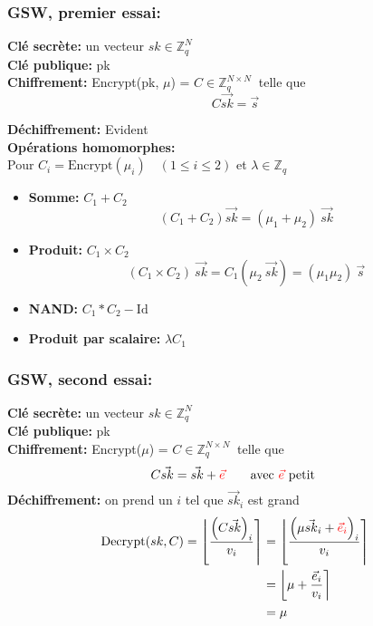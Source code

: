 \documentclass[10pt,xcolor={usenames,dvipsnames}]{beamer}
\newcommand{\ZZq}{\mathbb{Z}_q}
\begin{document}
\begin{frame} 
\frametitle{GSW, premier essai:}
\textbf{Clé secrète:} un vecteur $sk \in \ZZq^{N}$ \\
\textbf{Clé publique:} pk\\
\textbf{Chiffrement:} Encrypt(pk, $\mu$) = $C\in \ZZq^{N \times N}\:$ telle que  
\[C \vec{sk} = \vec{s}\]
\vspace{-1cm}

\textbf{Déchiffrement:} Evident \\
\textbf{Opérations homomorphes:}\\
Pour {\small$C_i = \text{Encrypt}(\mu_i) \quad(1 \leqslant i \leqslant 2)$}
et $\lambda \in \ZZq$
\begin{itemize}
\item \textbf{Somme:} $C_1 + C_2\quad$
\[\left(C_1 + C_2\right) \vec{sk} = (\mu_1 + \mu_2)\: \vec{sk}\]
\item \textbf{Produit:} $C_1 \times C_2\quad$
\[\left(C_1 \times C_2\right)\: \vec{sk} = C_1\left(\mu_2\:\vec{sk}\right) = (\mu_1 \mu_2)\:\vec{s}\]
\item \textbf{NAND:} $C_1 * C_2 - \text{Id}$
\item \textbf{Produit par scalaire:} $\lambda C_1\quad$
\end{itemize}
\end{frame} 


\begin{frame} 
\frametitle{GSW, second essai:}
\textbf{Clé secrète:} un vecteur $sk \in \ZZq^{N}$ \\
\textbf{Clé publique:} pk\\
\textbf{Chiffrement:} Encrypt($\mu$) = $C\in \ZZq^{N \times N}\:$ telle que  
\[C \vec{sk} = \vec{sk} + {\color{red}\vec{e}}\qquad \text{avec }  {\color{red}\vec{e}} \text{ petit} \]
\textbf{Déchiffrement:} on prend un $i$ tel que $\vec{sk}_i$ est grand
\begin{align*}
\text{Decrypt}(sk, C) = \left\lfloor \frac{{\left(C\vec{sk}\right)}_i}{v_i} \right\rceil &= 
\left\lfloor \frac{{\left(\mu\vec{sk}_i + {\color{red}\vec{e}_i}\right)}_i}{v_i} \right\rceil \\
&= \left\lfloor \mu + \frac{\vec{e}_i}{v_i} \right\rceil \\
&= \mu
\end{align*}
\end{frame} 
\end{document}
